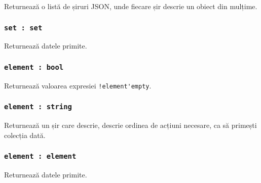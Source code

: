 Returnează o listă de șiruri JSON, unde fiecare șir descrie un obiect din mulțime.

\subsubsection{\lstinline|set : set|}

Returnează datele primite.

\subsubsection{\lstinline|element : bool|}

Returnează valoarea expresiei \lstinline|!element'empty|.

\subsubsection{\lstinline|element : string|}

Returnează un șir care descrie, descrie ordinea de acțiuni necesare, ca să primești colecția dată.

\subsubsection{\lstinline|element : element|}

Returnează datele primite.
